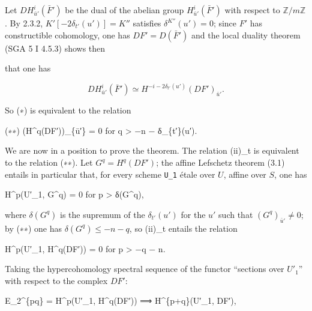 \documentclass[
]{article}
\newenvironment{Shaded}{}{}
\newcommand{\NormalTok}[1]{#1}
\begin{document}
Let \(DH^{i}_{\bar{u}'}(\bar{F}')\) be the dual of the abelian group
\(H^{i}_{\bar{u}'}(\bar{F}')\) with respect to
\(\mathbb{Z}/m\mathbb{Z}\). By 2.3.2, \(K'[-2 \delta_{t'}(u')] = K''\)
satisfies \(\delta^{K''}(u') = 0\); since \(F'\) has constructible
cohomology, one has \(DF' = D(\bar{F}')\) and the local duality theorem
(SGA 5 I 4.5.3) shows then

that one has

\[
DH^{i}_{\bar{u}'}(\bar{F}') \simeq H^{-i - 2 \delta_{t'}(u')}(DF')_{\bar{u}'}.
\]

So (∗) is equivalent to the relation

\begin{Shaded}
\begin{Highlighting}[]
\NormalTok{(∗∗) (H\^{}q(DF′))\_\{ū′\} = 0 for q \textgreater{} −n − δ\_\{t′\}(u′).}
\end{Highlighting}
\end{Shaded}

We are now in a position to prove the theorem. The relation (ii)\_t is
equivalent to the relation (∗∗). Let \(G^{q} = H^{q}(DF')\); the affine
Lefschetz theorem (3.1) entails in particular that, for every scheme
\texttt{U\_1} étale over \(U\), affine over \(S\), one has

\begin{Shaded}
\begin{Highlighting}[]
\NormalTok{H\^{}p(U′\_1, G\^{}q) = 0 for p \textgreater{} δ(G\^{}q),}
\end{Highlighting}
\end{Shaded}

where \(\delta(G^{q})\) is the supremum of the \(\delta_{t'}(u')\) for
the \(u'\) such that \((G^{q})_{\bar{u}'} \neq 0\); by (∗∗) one has
\(\delta(G^{q}) \leqslant -n - q\), so (ii)\_t entails the relation

\begin{Shaded}
\begin{Highlighting}[]
\NormalTok{H\^{}p(U′\_1, H\^{}q(DF′)) = 0 for p \textgreater{} −q − n.}
\end{Highlighting}
\end{Shaded}

Taking the hypercohomology spectral sequence of the functor ``sections
over \(U'_{1}\)'' with respect to the complex \(DF'\):

\begin{Shaded}
\begin{Highlighting}[]
\NormalTok{E\_2\^{}\{pq\} = H\^{}p(U′\_1, H\^{}q(DF′)) ⟹ H\^{}\{p+q\}(U′\_1, DF′),}
\end{Highlighting}
\end{Shaded}
\end{document}
